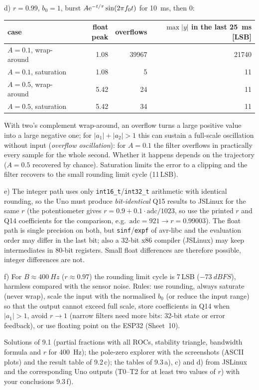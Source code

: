 \begin{solution}
d) $r=0.99$, $b_0=1$, burst $A\mathrm{e}^{-t/\tau}\sin(2\pi f_0t)$ for \SI{10}{ms}, then 0:
\begin{center}\small
\begin{tabular}{lrrr}
\toprule
case & float peak & overflows & $\max|y|$ in the last \SI{25}{ms} [LSB]\\
\midrule
$A=0.1$, wrap-around & 1.08 & 39967 & 21740\\
$A=0.1$, saturation & 1.08 & 5 & 11\\
$A=0.5$, wrap-around & 5.42 & 24 & 11\\
$A=0.5$, saturation & 5.42 & 34 & 11\\
\bottomrule
\end{tabular}
\end{center}
With two's complement wrap-around, an overflow turns a large positive value into
a large negative one; for $|a_1|+|a_2|>1$ this can sustain a full-scale
oscillation without input (\emph{overflow oscillation}): for $A=0.1$ the
filter overflows in practically every sample for the whole second. Whether it
happens depends on the trajectory ($A=0.5$ recovered by chance). Saturation
limits the error to a clipping and the filter recovers to the small rounding
limit cycle (11\,LSB).

e) The integer path uses only \texttt{int16\_t}/\texttt{int32\_t} arithmetic with
identical rounding, so the Uno must produce \emph{bit-identical} Q15 results to
JSLinux for the same $r$ (the potentiometer gives $r=0.9+0.1\cdot\mathrm{adc}/1023$,
so use the printed $r$ and Q14 coefficients for the comparison, e.g.\
$\mathrm{adc}=921\rightarrow r=0.99003$). The float path is single precision on
both, but \texttt{sinf}/\texttt{expf} of avr-libc and the evaluation order may
differ in the last bit; also a 32-bit x86 compiler (JSLinux) may keep
intermediates in 80-bit registers. Small float differences are therefore
possible, integer differences are not.

f) For $B\approx\SI{400}{Hz}$ ($r\approx0.97$) the rounding limit cycle is
7\,LSB ($\SI{-73}{dBFS}$), harmless compared with the sensor noise. Rules: use
rounding, always saturate (never wrap), scale the input with the normalised
$b_0$ (or reduce the input range) so that the output cannot exceed full scale,
store coefficients in Q14 when $|a_1|>1$, avoid $r\to1$ (narrow filters need
more bits: 32-bit state or error feedback), or use floating point on the
ESP32 (Sheet~10).
\end{solution}

\begin{deliverables}
Solutions of 9.1 (partial fractions with all ROCs, stability triangle, bandwidth
formula and $r$ for \SI{400}{Hz}); the pole-zero explorer with the screenshots
(ASCII plots) and the result table of 9.2\,c); the tables of 9.3\,a), c) and
d) from JSLinux and the corresponding Uno outputs (T0--T2 for at least two
values of $r$) with your conclusions 9.3\,f).
\end{deliverables}
